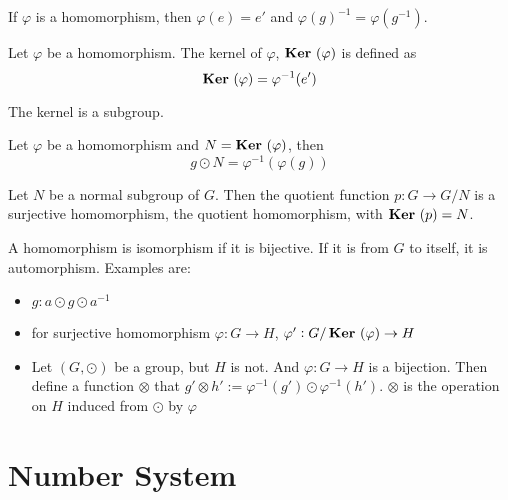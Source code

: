 \begin{theorem}
    If $\varphi$ is a homomorphism, then $\varphi(e) = e'$ and $\varphi(g)^{-1} = \varphi(g^{-1})$.
\end{theorem}

\begin{definition}
    Let $\varphi$ be a homomorphism. The kernel of $\varphi$, $\displaystyle \mathop{\bf Ker\/}~( \varphi )$ is defined as
    \begin{equation}
        \displaystyle \mathop{\bf Ker\/}~( \varphi ) = \varphi^{-1}(e')
    \end{equation}
    
    The kernel is a subgroup.
\end{definition}

\begin{theorem}
Let $\varphi$ be a homomorphism and $N = \displaystyle \mathop{\bf Ker\/}~( \varphi )$, then
\begin{equation}
    g \odot N = \varphi^{-1}\left(\varphi(g)\right)
\end{equation}
\end{theorem}

\begin{theorem}
    Let $N$ be a normal subgroup of $G$. Then the quotient function $p: G \rightarrow G/N$ is a surjective homomorphism, the quotient homomorphism, with $\displaystyle \mathop{\bf Ker\/}~( p ) = N$.
\end{theorem}


\begin{definition}
    A homomorphism is isomorphism if it is bijective. If it is from $G$ to itself, it is automorphism. Examples are:
    \begin{itemize}
        \item $g: a \odot g \odot a^{-1}$
        \item for surjective homomorphism $\varphi: G \rightarrow H$, $\varphi' : G/\displaystyle \mathop{\bf Ker\/}~( \varphi ) \rightarrow H$
        \item Let $(G, \odot)$ be a group, but $H$ is not. And $\varphi: G \rightarrow H$ is a bijection. Then define a function $\otimes$ that $g' \otimes h' := \varphi^{-1}(g') \odot \varphi^{-1}(h')$. $\otimes$ is the operation on $H$ induced from $\odot$ by $\varphi$
    \end{itemize}
\end{definition}



\section{Number System}

